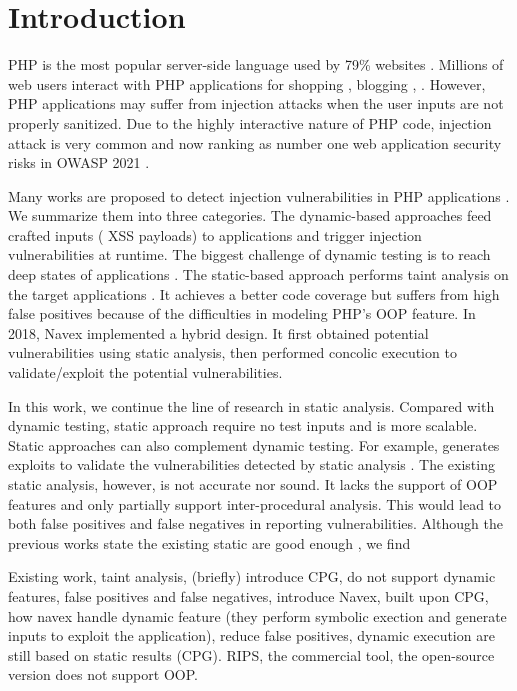 \section{Introduction}
\label{s:intro}

PHP is the most popular server-side language used by 79\% websites \cite{php-usage}.
Millions of web users interact with PHP applications for shopping \cite{Magento, Prestashop}, blogging \cite{WordPress, Joomla}, \etc{}.
However, PHP applications may suffer from injection attacks \cite{injection-attack} when the user inputs are not properly sanitized.
Due to the highly interactive nature of PHP code, injection attack is very common and now ranking as number one web application security risks in OWASP 2021 \cite{OWASP-top10}.

Many works are proposed to detect injection vulnerabilities in PHP applications \citep{blackwidow, Rivulet, navex, rips, php-cpg, enemy}.
We summarize them into three categories.
The dynamic-based approaches feed crafted inputs (\eg{,} XSS payloads) to applications and trigger injection vulnerabilities at runtime.
The biggest challenge of dynamic testing is to reach deep states of applications \citep{blackwidow}.
The static-based approach performs taint analysis on the target applications \citep{rips}.
It achieves a better code coverage but suffers from high false positives because of the difficulties in modeling PHP's OOP feature.
In 2018, Navex \citep{navex} implemented a hybrid design.
It first obtained potential vulnerabilities using static analysis, then performed concolic execution to validate/exploit the potential vulnerabilities.

In this work, we continue the line of research in static analysis.
Compared with dynamic testing, static approach require no test inputs and is more scalable.
Static approaches can also complement dynamic testing.
For example, \citep{navex} generates exploits to validate the vulnerabilities detected by static analysis \cite{php-cpg}.
The existing static analysis, however, is not accurate nor sound.
It lacks the support of OOP features \citep{rips} and only partially support inter-procedural analysis.
This would lead to both false positives and false negatives in reporting vulnerabilities.
Although the previous works state the existing static  are good enough \citep{navex, php-cpg}, we find 


Existing work, taint analysis, (briefly) introduce CPG, do not support dynamic features, false positives and false negatives, introduce Navex, built upon CPG, how navex handle dynamic feature (they perform symbolic exection and generate inputs to exploit the application), reduce false positives, dynamic execution are still based on static results (CPG). RIPS, the commercial tool, the open-source version does not support OOP. 

